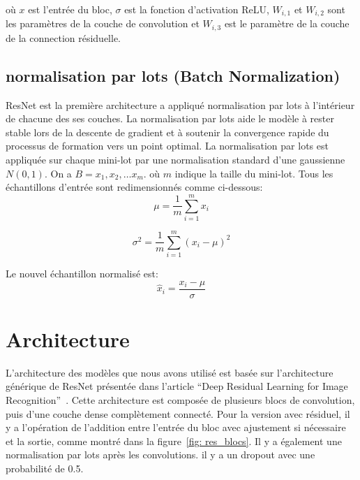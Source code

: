 \documentclass{article}
\begin{document}
où $x$ est l'entrée du bloc, $\sigma$ est la fonction d'activation ReLU, $W_{i,1}$ et $W_{i,2}$ sont les paramètres de la
couche de convolution et $W_{i,3}$ est le paramètre de la couche de la connection résiduelle.


\subsection{normalisation par lots (Batch Normalization)}
ResNet est la première architecture a appliqué normalisation par lots à l'intérieur de chacune des ses couches. La normalisation par lots aide le
modèle à rester stable lors de la descente de gradient et à soutenir la convergence rapide du processus de formation vers
un point optimal.
La normalisation par lots est appliquée sur chaque mini-lot par une normalisation standard d'une gaussienne $N(0,1)$.
On a $B=x_1,x_2,\dots x_m$.
où $m$ indique la taille du mini-lot. Tous les échantillons d'entrée sont redimensionnés comme ci-dessous:
\begin{equation}
    \mu = \frac{1}{m}\sum_{i=1}^{m}x_{i}
\end{equation}

\begin{equation}
    \sigma^{2} = \frac{1}{m}\sum_{i=1}^{m}(x_{i} - \mu)^{2}
\end{equation}

Le nouvel échantillon normalisé est:
\begin{equation}
    \hat{x}_{i} = \frac{x_{i} - \mu}{\sigma}
\end{equation}

\section{Architecture}

L'architecture des modèles que nous avons utilisé est basée sur l'architecture générique de ResNet présentée dans l'article
``Deep Residual Learning for Image Recognition''~\cite{resnet}. Cette architecture est composée de plusieurs blocs de
convolution, puis d'une couche dense complètement connecté. Pour la version avec résiduel, il y a l'opération de l'addition entre
l'entrée du bloc avec ajustement si nécessaire et la sortie, comme montré dans la figure~\ref{fig: res_blocs}.
Il y a également une normalisation par lots après les convolutions.
il y a un dropout avec une probabilité de 0.5.
\end{document}

